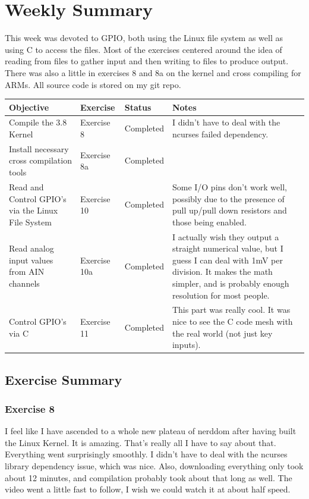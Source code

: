 \documentclass[letterpaper,10pt]{texMemo}
\begin{document}
\maketitle

\section{Weekly Summary}

\noindent This week was devoted to GPIO, both using the Linux file system as
well as using C to access the files. Most of the exercises centered around the
idea of reading from files to gather input and then writing to files to produce
output. There was also a little in exercises 8 and 8a on the kernel and cross
compiling for ARMs. All source code is stored on my git repo. \\

\begin{center}
\begin{tabular}{|p{4cm}|l|l|p{8cm}|}
\hline
\textbf{Objective} & \textbf{Exercise} &\textbf{Status} & \textbf{Notes}\\
\hline
Compile the 3.8 Kernel & Exercise 8 & Completed & I didn't have to deal with
the ncurses failed dependency.\\
\hline
Install necessary cross compilation tools & Exercise 8a & Completed & \\
\hline
Read and Control GPIO's via the Linux File System & Exercise 10 & Completed &
Some I/O pins don't work well, possibly due to the presence of pull up/pull
down resistors and those being enabled.\\
\hline
Read analog input values from AIN channels & Exercise 10a & Completed & I
actually wish they output a straight numerical value, but I guess I can deal
with 1mV per division. It makes the math simpler, and is probably enough
resolution for most people.\\
\hline
Control GPIO's via C & Exercise 11 & Completed & This part was really cool. It
was nice to see the C code mesh with the real world (not just key inputs). \\
\hline
\end{tabular}
\end{center}

\subsection{Exercise Summary}

\subsubsection{Exercise 8}
\noindent I feel like I have ascended to a whole new plateau of nerddom after
having built the Linux Kernel. It is amazing. That's really all I have to say
about that. Everything went surprisingly smoothly. I didn't have to deal with
the ncurses library dependency issue, which was nice. Also, downloading
everything only took about 12 minutes, and compilation probably took about that
long as well. The video went a little fast to follow, I wish we could watch it
at about half speed.
\end{document}
